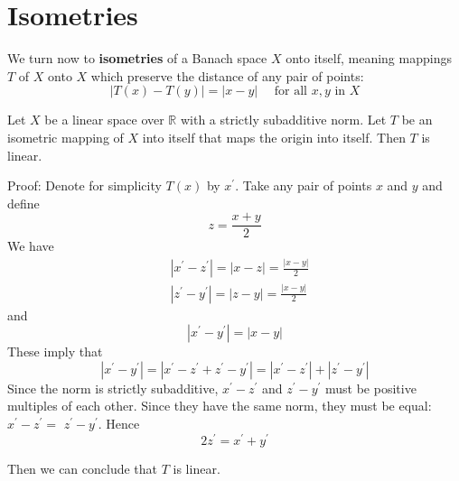 \documentclass[12pt, oneside]{book}
\begin{document}
\section{Isometries}
\begin{definition}
    We turn now to \textbf{isometries} of a Banach space $X$ onto itself, meaning mappings $T$ of $X$ onto $X$ which preserve the distance of any pair of points:
    \begin{equation*}
        |T(x)-T(y)|=|x-y| \quad \text { for all } x, y \text { in } X
    \end{equation*}

\end{definition}
\begin{theorem}
    Let $X$ be a linear space over $\mathbb{R}$ with a strictly subadditive norm. Let $T$ be an isometric mapping of $X$ into itself that maps the origin into itself. Then $T$ is linear.

    Proof:
    Denote for simplicity $T(x)$ by $x^{\prime}$. Take any pair of points $x$ and $y$ and define
    \begin{equation*}
        z=\frac{x+y}{2}
    \end{equation*}
    We have
    \begin{equation*}
        \begin{aligned}
             & \left|x^{\prime}-z^{\prime}\right|=|x-z|=\frac{|x-y|}{2} \\
             & \left|z^{\prime}-y^{\prime}\right|=|z-y|=\frac{|x-y|}{2}
        \end{aligned}
    \end{equation*}
    and
    \begin{equation*}
        \left|x^{\prime}-y^{\prime}\right|=|x-y|
    \end{equation*}
    These imply that
    \begin{equation*}
        \left|x^{\prime}-y^{\prime}\right|=\left|x^{\prime}-z^{\prime}+z^{\prime}-y^{\prime}\right|=\left|x^{\prime}-z^{\prime}\right|+\left|z^{\prime}-y^{\prime}\right|
    \end{equation*}
    Since the norm is strictly subadditive, $x^{\prime}-z^{\prime}$ and $z^{\prime}-y^{\prime}$ must be positive multiples of each other. Since they have the same norm, they must be equal: $x^{\prime}-z^{\prime}=$ $z^{\prime}-y^{\prime}$. Hence
    \begin{equation*}
        2 z^{\prime}=x^{\prime}+y^{\prime}
    \end{equation*}

    Then we can conclude that $T$ is linear.
\end{theorem}
\end{document}
